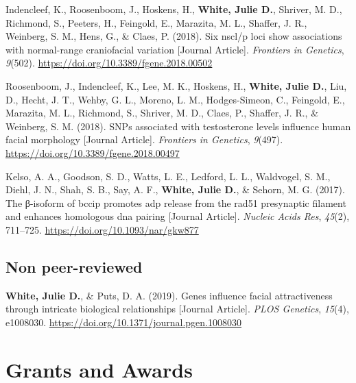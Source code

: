 \documentclass[11pt, a4paper]{awesome-cv}
\begin{document}
\leavevmode\hypertarget{ref-Indencleef_2018_SixNSCLP}{}%
Indencleef, K., Roosenboom, J., Hoskens, H., \textbf{White, Julie D.},
Shriver, M. D., Richmond, S., Peeters, H., Feingold, E., Marazita, M.
L., Shaffer, J. R., Weinberg, S. M., Hens, G., \& Claes, P. (2018). Six
nscl/p loci show associations with normal-range craniofacial variation
{[}Journal Article{]}. \emph{Frontiers in Genetics}, \emph{9}(502).
\url{https://doi.org/10.3389/fgene.2018.00502}

\leavevmode\hypertarget{ref-Rosenboom_2018_Testosterone}{}%
Roosenboom, J., Indencleef, K., Lee, M. K., Hoskens, H., \textbf{White,
Julie D.}, Liu, D., Hecht, J. T., Wehby, G. L., Moreno, L. M.,
Hodges-Simeon, C., Feingold, E., Marazita, M. L., Richmond, S., Shriver,
M. D., Claes, P., Shaffer, J. R., \& Weinberg, S. M. (2018). SNPs
associated with testosterone levels influence human facial morphology
{[}Journal Article{]}. \emph{Frontiers in Genetics}, \emph{9}(497).
\url{https://doi.org/10.3389/fgene.2018.00497}

\leavevmode\hypertarget{ref-Kelso_2017_BCCIP}{}%
Kelso, A. A., Goodson, S. D., Watts, L. E., Ledford, L. L., Waldvogel,
S. M., Diehl, J. N., Shah, S. B., Say, A. F., \textbf{White, Julie D.},
\& Sehorn, M. G. (2017). The β-isoform of bccip promotes adp release
from the rad51 presynaptic filament and enhances homologous dna pairing
{[}Journal Article{]}. \emph{Nucleic Acids Res}, \emph{45}(2), 711--725.
\url{https://doi.org/10.1093/nar/gkw877}

\endgroup

\hypertarget{non-peer-reviewed}{%
\subsection{Non peer-reviewed}\label{non-peer-reviewed}}

\begingroup
\setlength{\parindent}{-0.5in}
\setlength{\leftskip}{0.5in}

\hypertarget{refs_nonreviewed}{}
\leavevmode\hypertarget{ref-White__2019_Attractiveness}{}%
\textbf{White, Julie D.}, \& Puts, D. A. (2019). Genes influence facial
attractiveness through intricate biological relationships {[}Journal
Article{]}. \emph{PLOS Genetics}, \emph{15}(4), e1008030.
\url{https://doi.org/10.1371/journal.pgen.1008030}

\endgroup

\hypertarget{grants-and-awards}{%
\section{Grants and Awards}\label{grants-and-awards}}
\end{document}
